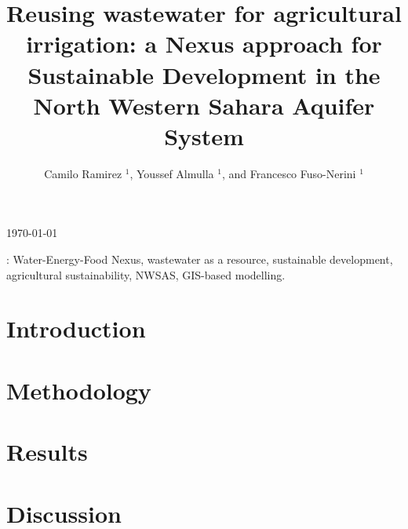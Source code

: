 \documentclass[12pt]{iopart}
\begin{document}
\title[Reusing wastewater in agriculture: a Nexus assessment in the NWSAS]{Reusing wastewater for agricultural irrigation: a Nexus approach for Sustainable Development in the North Western Sahara Aquifer System}

\author{Camilo Ramirez $^{1}$, Youssef Almulla $^{1}$, and Francesco Fuso-Nerini $^{1}$}

\address{$^{1}$ KTH Royal Institute of Technology, Stockholm, Sweden}
\vspace{10pt}
\begin{indented}
\item[]\today
\end{indented}

\begin{abstract}

\end{abstract}

\vspace{2pc}
: Water-Energy-Food Nexus, wastewater as a resource, sustainable development, agricultural sustainability, NWSAS, GIS-based modelling.

%
% 
%
\section{Introduction}


\newpage
\section{Methodology}


\section{Results}


\section{Discussion}



\newcommand{\newblock}{}


\end{document}
